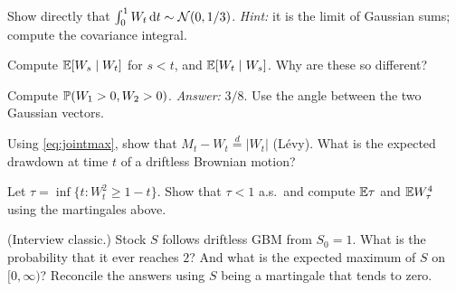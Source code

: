 \begin{exercises}
\item Show directly that $\int_0^1W_t\,\mathrm{d} t\sim\mathcal{N}(0,1/3)$. \emph{Hint:} it is the limit of Gaussian sums; compute the covariance integral.
\item Compute $\mathbb{E}[W_s\mid W_t]$ for $s<t$, and $\mathbb{E}[W_t\mid W_s]$. Why are these so different?
\item Compute $\mathbb{P}(W_1>0,W_2>0)$. \emph{Answer:} $3/8$. Use the angle between the two Gaussian vectors.
\item Using \eqref{eq:jointmax}, show that $M_t-W_t\overset{d}{=}|W_t|$ (L\'evy). What is the expected drawdown at time $t$ of a driftless Brownian motion?
\item Let $\tau=\inf\{t:W_t^2\ge1-t\}$. Show that $\tau<1$ a.s.\ and compute $\mathbb{E}\tau$ and $\mathbb{E} W_\tau^4$ using the martingales above.
\item (Interview classic.) Stock $S$ follows driftless GBM from $S_0=1$. What is the probability that it ever reaches $2$? And what is the expected maximum of $S$ on $[0,\infty)$? Reconcile the answers using $S$ being a martingale that tends to zero.
\end{exercises}
